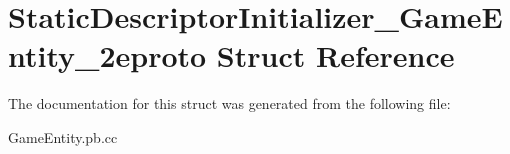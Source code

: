 \hypertarget{struct_static_descriptor_initializer___game_entity__2eproto}{}\section{Static\+Descriptor\+Initializer\+\_\+\+Game\+Entity\+\_\+2eproto Struct Reference}
\label{struct_static_descriptor_initializer___game_entity__2eproto}


The documentation for this struct was generated from the following file\+:\begin{DoxyCompactItemize}
\item 
Game\+Entity.\+pb.\+cc\end{DoxyCompactItemize}
